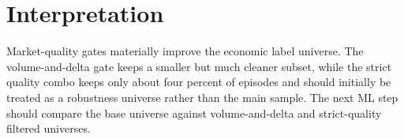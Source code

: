 \documentclass[11pt]{article}
\begin{document}
\section{Interpretation}

Market-quality gates materially improve the economic label universe. The
volume-and-delta gate keeps a smaller but much cleaner subset, while the strict
quality combo keeps only about four percent of episodes and should initially be
treated as a robustness universe rather than the main sample. The next ML step
should compare the base universe against volume-and-delta and strict-quality
filtered universes.
\end{document}
